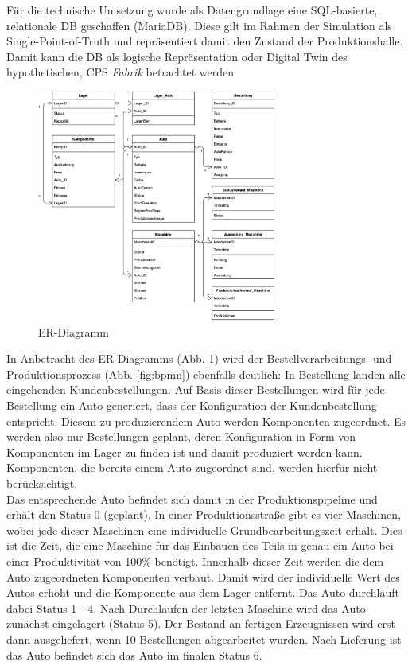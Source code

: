 Für die technische Umsetzung wurde als Datengrundlage eine SQL-basierte, relationale \ac{DB} geschaffen (MariaDB). Diese gilt im Rahmen der Simulation als Single-Point-of-Truth und repräsentiert damit den Zustand der Produktionshalle. Damit kann die \ac{DB} als logische Repräsentation oder Digital Twin des hypothetischen, \ac{CPS} \textit{Fabrik} betrachtet werden
\begin{figure}[H]
    \centering
    \includegraphics[width=0.7\textwidth]{ausarbeitung-latex/img/ER-Diagramm.png}
    \caption{ER-Diagramm}
    \label{fig:er}
\end{figure}
In Anbetracht des ER-Diagramms (Abb. \ref{fig:er}) wird der Bestellverarbeitungs- und Produktionsprozess (Abb. \ref{fig:bpmn}) ebenfalls deutlich: In Bestellung landen alle eingehenden Kundenbestellungen. Auf Basis dieser Bestellungen wird für jede Bestellung ein Auto generiert, dass der Konfiguration der Kundenbestellung entspricht. Diesem zu produzierendem Auto werden Komponenten zugeordnet. Es werden also nur Bestellungen geplant, deren Konfiguration in Form von Komponenten im Lager zu finden ist und damit produziert werden kann. Komponenten, die bereits einem Auto zugeordnet sind, werden hierfür nicht berücksichtigt.
\\Das entsprechende Auto befindet sich damit in der Produktionspipeline und erhält den Status 0 (geplant).
In einer Produktionsstraße gibt es vier Maschinen, wobei jede dieser Maschinen eine individuelle Grundbearbeitungszeit erhält. Dies ist die Zeit, die eine Maschine für das Einbauen des Teils in genau ein Auto bei einer Produktivität von 100\% benötigt. Innerhalb dieser Zeit werden die dem Auto zugeordneten Komponenten verbaut. Damit wird der individuelle Wert des Autos erhöht und die Komponente aus dem Lager entfernt. Das Auto durchläuft dabei Status 1 - 4. Nach Durchlaufen der letzten Maschine wird das Auto zunächst eingelagert (Status 5). Der Bestand an fertigen Erzeugnissen wird erst dann ausgeliefert, wenn 10 Bestellungen abgearbeitet wurden. Nach Lieferung ist das Auto befindet sich das Auto im finalen Status 6.
